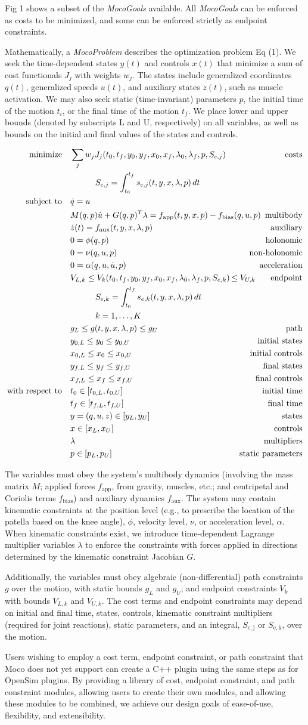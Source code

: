 \documentclass[10pt,letterpaper]{article}
\newcommand{\ocp}{
\begin{align}
    \begin{aligned}
        \mbox{minimize}
         \quad & \sum_j w_{j} J_{j}(t_0, t_f, y_0, y_f, x_{0}, x_{f}, \lambda_0, \lambda_f, p, S_{c,j}) & \textrm{costs} \\
        & \quad\quad\quad S_{c,j} = \int_{t_0}^{t_f} s_{c,j}(t, y, x, \lambda, p)\,dt  \\
        \mbox{subject to}
         \quad & \dot{q} = u \\
         & M(q, p)\dot{u} + G(q, p)^T \lambda = f_{\mathrm{app}}(t, y, x, p) - \mathrlap{f_{\mathrm{bias}}(q, u, p)}  & \textrm{multibody} \\
         & \dot{z}(t) = f_{\mathrm{aux}}(t, y, x, \lambda, p) & \textrm{auxiliary} \\
         & 0 = \phi(q, p) & \textrm{holonomic} \\
         & 0 = \nu(q, u, p) & \textrm{non-holonomic} \\
         & 0 = \alpha(q, u, \dot{u}, p) & \textrm{acceleration} \\
         & V_{L,k} \leq V_k(t_0, t_f, y_0, y_f, x_{0}, x_{f}, \lambda_0, \lambda_f, p, S_{e,k}) \,\mathrlap{\leq V_{U,k}} & \textrm{endpoint} \\
         & \quad\quad\quad S_{e,k} = \int_{t_0}^{t_f} s_{e,k}(t, y, x, \lambda, p)\,dt \\
         & \quad\quad\quad k = 1, \ldots, K \\
         & g_{L} \leq g(t, y, x, \lambda, p) \leq g_{U} & \textrm{path} \\
         & y_{0,L} \leq y_0 \leq y_{0,U} & \textrm{initial states} \\
         & x_{0,L} \leq x_0 \leq x_{0,U} & \textrm{initial controls} \\
         & y_{f,L} \leq y_f \leq y_{f,U} & \textrm{final states} \\
         & x_{f,L} \leq x_f \leq x_{f,U} & \textrm{final controls} \\
         \mbox{with respect to} \quad
         & t_0 \in [t_{0,L}, t_{0,U}] & \textrm{initial time} \\
         & t_f \in [t_{f,L}, t_{f,U}] & \textrm{final time} \\
         & y = (q, u, z) \in [y_{L}, y_{U}] & \textrm{states} \\
         & x \in [x_{L}, x_{U}] & \textrm{controls} \\
         & \lambda & \textrm{multipliers} \\
         & p \in [p_{L}, p_{U}] & \textrm{static parameters}
    \end{aligned}
\end{align}
}
\begin{document}
Fig 1 shows a subset of the \textit{MocoGoals} available. All \textit{MocoGoals} can be enforced as costs to be minimized, and some can be enforced strictly as endpoint constraints.

Mathematically, a \textit{MocoProblem} describes the optimization problem Eq (1). We seek the time-dependent states $y(t)$ and controls $x(t)$ that minimize a sum of cost functionals $J_j$ with weights $w_j$. The states include generalized coordinates $q(t)$, generalized speeds $u(t)$, and auxiliary states $z(t)$, such as muscle activation. We may also seek static (time-invariant) parameters $p$, the initial time of the motion $t_i$, or the final time of the motion $t_f$. We place lower and upper bounds (denoted by subscripts L and U, respectively) on all variables, as well as bounds on the initial and final values of the states and controls.

\ocp

The variables must obey the system’s multibody dynamics (involving the mass matrix $M$; applied forces $f_\mathrm{app}$, from gravity, muscles, etc.; and centripetal and Coriolis terms $f_\mathrm{bias}$) and auxiliary dynamics $f_\mathrm{aux}$. The system may contain kinematic constraints at the position level (e.g., to prescribe the location of the patella based on the knee angle), $\phi$, velocity level, $\nu$, or acceleration level, $\alpha$. When kinematic constraints exist, we introduce time-dependent Lagrange multiplier variables $\lambda$ to enforce the constraints with forces applied in directions determined by the kinematic constraint Jacobian $G$.

Additionally, the variables must obey algebraic (non-differential) path constraints $g$ over the motion, with static bounds $g_L$ and $g_U$; and endpoint constraints $V_k$ with bounds $V_{L,k}$ and $V_{U,k}$. The cost terms and endpoint constraints may depend on initial and final time, states, controls, kinematic constraint multipliers (required for joint reactions), static parameters, and an integral, $S_\mathrm{c,j}$ or $S_\mathrm{e,k}$, over the motion.

Users wishing to employ a cost term, endpoint constraint, or path constraint that Moco does not yet support can create a C++ plugin using the same steps as for OpenSim plugins. By providing a library of cost, endpoint constraint, and path constraint modules, allowing users to create their own modules, and allowing these modules to be combined, we achieve our design goals of ease-of-use, flexibility, and extensibility.
\end{document}
